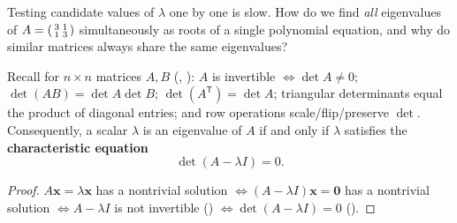 \documentclass[10pt]{scrartcl}
\newcommand{\vv}[1]{\mathbf{#1}}
\begin{document}
\begin{qbox}
  Testing candidate values of $\lambda$ one by one is slow. How do we find \emph{all} eigenvalues of $A=\begin{psmallmatrix}3&1\\1&3\end{psmallmatrix}$ simultaneously as roots of a single polynomial equation, and why do similar matrices always share the same eigenvalues?
\end{qbox}

\begin{theorem*}
  Recall for $n\times n$ matrices $A,B$ (, ): $A$ is invertible $\iff \det A\ne 0$; $\det(AB)=\det A\det B$; $\det(A^{\mathsf T})=\det A$; triangular determinants equal the product of diagonal entries; and row operations scale/flip/preserve $\det$. Consequently, a scalar $\lambda$ is an eigenvalue of $A$ if and only if $\lambda$ satisfies the \textbf{characteristic equation}
  \[
    \det(A - \lambda I) = 0.
  \]
\end{theorem*}
\begin{proof}
  $A\vv x=\lambda\vv x$ has a nontrivial solution $\iff (A-\lambda I)\vv x=\vv 0$ has a nontrivial solution $\iff A-\lambda I$ is not invertible () $\iff \det(A-\lambda I)=0$ ().
\end{proof}
\end{document}
